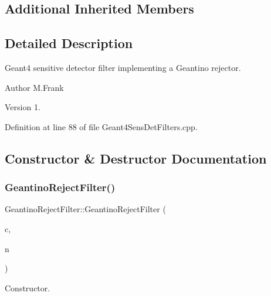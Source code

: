 \subsection*{Additional Inherited Members}


\subsection{Detailed Description}
Geant4 sensitive detector filter implementing a Geantino rejector. 

\begin{DoxyAuthor}{Author}
M.\+Frank 
\end{DoxyAuthor}
\begin{DoxyVersion}{Version}
1. 
\end{DoxyVersion}


Definition at line 88 of file Geant4\+Sens\+Det\+Filters.\+cpp.



\subsection{Constructor \& Destructor Documentation}
\hypertarget{struct_d_d4hep_1_1_simulation_1_1_geantino_reject_filter_a1c59ff0c23002a3c6325c3ba74c92f35}{}\label{struct_d_d4hep_1_1_simulation_1_1_geantino_reject_filter_a1c59ff0c23002a3c6325c3ba74c92f35} 
\subsubsection{\texorpdfstring{Geantino\+Reject\+Filter()}{GeantinoRejectFilter()}}
{\footnotesize\ttfamily Geantino\+Reject\+Filter\+::\+Geantino\+Reject\+Filter (\begin{DoxyParamCaption}\item[{\hyperlink{class_d_d4hep_1_1_simulation_1_1_geant4_context}{Geant4\+Context} $\ast$}]{c,  }\item[{const std\+::string \&}]{n }\end{DoxyParamCaption})}



Constructor. 



